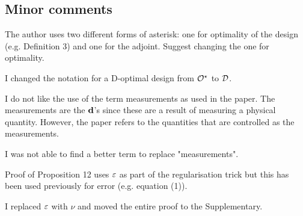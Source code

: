 \subsection{Minor comments}
\RC The author uses two different forms of asterisk: one for
optimality of the design (e.g. Definition 3) and one for the
adjoint. Suggest changing the one for optimality.

\AR I changed the notation for a D-optimal design from $\mathcal{O}^\star$ to
$\mathcal{D}$.
  
\RC I do not like the use of the term measurements as used in the
paper. The measurements are the $\mathbf{d}$’s since these are a result of
measuring a physical quantity. However, the paper refers to the
quantities that are controlled as the measurements.

\AR I was not able to find a better term to replace "measurements".
  
\RC Proof of Proposition 12 uses $\varepsilon$ as part of the regularisation
trick but this has been used previously for error (e.g. equation (1)).
  
\AR I replaced $\varepsilon$ with $\nu$ and moved the entire proof to the
Supplementary.























